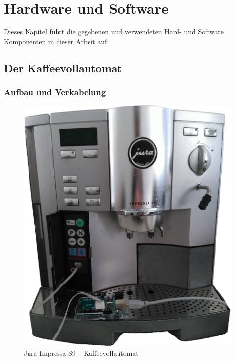 \chapter{Hardware und Software}
Dieses Kapitel führt die gegebenen und verwendeten Hard- und Software Komponenten in dieser Arbeit auf.

\section{Der Kaffeevollautomat}

\subsection{Aufbau und Verkabelung}
\begin{figure}
  \begin{center}
    \includegraphics[scale=0.2]{images/Jura-Impressa-S9-small}
    \caption{Jura Impressa S9 -- Kaffeevollautomat}
    \label{fig:Kaffeevollautomat}
  \end{center}
\end{figure}

